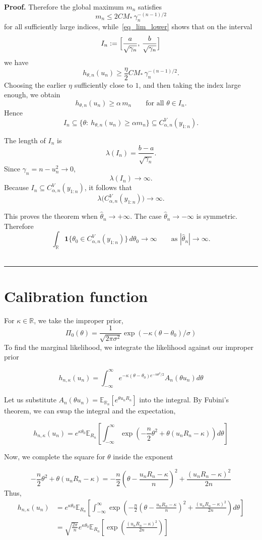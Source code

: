 \documentclass{article}%
\newenvironment{proof}[1][Proof]{\noindent\textbf{#1.} }{\ \rule{0.5em}{0.5em}}
\newcommand{\E}{\mathbb{E}}
\begin{document}
\begin{proof}
Therefore the global maximum \(m_n\) satisfies
\[
m_n\le 2 C M_*\,\gamma_n^{-(n-1)/2}
\]
for all sufficiently large indices, while~\eqref{eq_lim_lower} shows that on the interval
\[
I_n:=\Bigl[\frac{a}{\sqrt{\gamma_n}},\, \frac{b}{\sqrt{\gamma_n}}\Bigr]
\]
we have
\[
h_{\theta,n}(u_n)\ge \frac{\eta}{2} C M_*\,\gamma_n^{-(n-1)/2}.
\]
Choosing the earlier \(\eta\) sufficiently close to \(1\), and then taking the index large enough, we obtain
\[
h_{\theta,n}(u_n)\ge \alpha\, m_n
\qquad\text{for all }\theta\in I_n.
\]
Hence
\[
I_n\subseteq \{\theta:\ h_{\theta,n}(u_n)\ge \alpha m_n\}\subseteq C^V_{\alpha,n}(y_{1:n}).
\]

The length of \(I_n\) is
\[
\lambda(I_n)=\frac{b-a}{\sqrt{\gamma_n}}.
\]
Since \(\gamma_n=n-u_n^2\to0\),
\[
\lambda(I_n)\to\infty.
\]
Because \(I_n\subseteq C^V_{\alpha,n}(y_{1:n})\), it follows that
\[
\lambda\bigl(C^V_{\alpha,n}(y_{1:n})\bigr)\to\infty.
\]

This proves the theorem when \(\hat\theta_n\to+\infty\). The case \(\hat\theta_n\to-\infty\) is symmetric. Therefore
\[
\int_{\mathbb R}\mathbf 1\{\theta_0\in C^V_{\alpha,n}(y_{1:n})\}\,d\theta_0 \to \infty
\qquad\text{as }|\hat\theta_n|\to\infty.
\]
\end{proof}

\section{Calibration function}

For $\kappa \in \mathbb{R}$, we take the improper prior, 
\[
\Pi_0(\theta) = \frac{1}{\sqrt{2\pi \sigma^2}} \exp(-\kappa(\theta - \theta_0)/\sigma) 
\]
To find the marginal likelihood, we integrate the likelihood against our improper prior 

\[
h_{n, \kappa}(u_n) = \int_{-\infty}^\infty e^{-\kappa(\theta - \theta_0) e^{-n\theta^2/2}} A_n(\theta u_n) d\theta
\]

Let us substitute $A_n(\theta u_n) = \E_{\mathbb{R}_n}[e^{\theta u_n R_n}]$ into the integral. By Fubini's theorem, we can swap the integral and the expectation,

\[
h_{n, \kappa}(u_n) = e^{\kappa\theta_0} \E_{R_n} [\int_{-\infty}^\infty \exp(-\frac{n}{2} \theta^2 + \theta(u_nR_n - \kappa))d\theta ]
\]

Now, we complete the square for $\theta$ inside the exponent

\[
-\frac{n}{2} \theta^2 + \theta(u_nR_n - \kappa) = -\frac{n}{2}( \theta - \frac{u_nR_n - \kappa}{n} )^2 + \frac{(u_nR_n - \kappa)^2}{2n}
\]
Thus,
\begin{align*}
    h_{n, \kappa}(u_n) & = e^{\kappa\theta_0} \E_{R_n} [\int_{-\infty}^\infty \exp ( -\frac{n}{2}( \theta - \frac{u_nR_n - \kappa}{n} )^2 + \frac{(u_nR_n - \kappa)^2}{2n}) d\theta ] \\
    & = \sqrt{\frac{2\pi}{n}} e^{\kappa\theta_0} \E_{R_n} [ \exp( \frac{(u_nR_n - \kappa)^2}{2n})] 
\end{align*}
\end{document}
